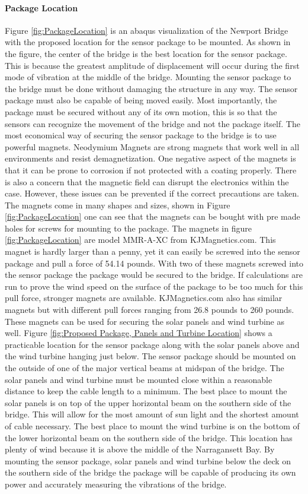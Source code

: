 \paragraph{Package Location}
\indent Figure \ref{fig:PackageLocation} is an abaqus visualization of the Newport Bridge with the proposed location for the sensor package to be mounted.
As shown in the figure, the center of the bridge is the best location for the sensor package. This is because the greatest amplitude of displacement will
occur during the first mode of vibration at the middle of the bridge. Mounting the sensor package to the bridge must be done without damaging the
structure in any way. The sensor package must also be capable of being moved easily. Most importantly, the package must be secured without any of its
own motion, this is so that the sensors can recognize the movement of the bridge and not the package itself. The most economical way of securing the
sensor package to the bridge is to use powerful magnets. Neodymium Magnets are strong magnets that work well in all environments and resist
demagnetization. One negative aspect of the magnets is that it can be prone to corrosion if not protected with a coating properly. There is also a
concern that the magnetic field can disrupt the electronics within the case. However, these issues can be prevented if the correct precautions are
taken. The magnets come in many shapes and sizes, shown in Figure \ref{fig:PackageLocation} one can see that the magnets can be bought with pre
made holes for screws for mounting to the package. The magnets in figure \ref{fig:PackageLocation} are model MMR-A-XC from KJMagnetics.com. This
magnet is hardly larger than a penny, yet it can easily be screwed into the sensor package and pull a force of 54.14 pounds. With two of these
magnets screwed into the sensor package the package would be secured to the bridge. If calculations are run to prove the wind speed on the
surface of the package to be too much for this pull force, stronger magnets are available. KJMagnetics.com also has similar magnets but with
different pull forces ranging from 26.8 pounds to 260 pounds. These magnets can be used for securing the solar panels and wind turbine as
well. Figure \ref{fig:Proposed Package, Panels and Turbine Location} shows a practicable location for the sensor package along with the solar
panels above and the wind turbine hanging just below. The sensor package should be mounted on the outside of one of the major vertical beams
at midspan of the bridge. The solar panels and wind turbine must be mounted close within a reasonable distance to keep the cable length to
a minimum. The best place to mount the solar panels is on top of the upper horizontal beam on the southern side of the bridge. This will
allow for the most amount of sun light and the shortest amount of cable necessary. The best place to mount the wind turbine is on the
bottom of the lower horizontal beam on the southern side of the bridge. This location has plenty of wind because it is above the middle
of the Narragansett Bay. By mounting the sensor package, solar panels and wind turbine below the deck on the southern side of the
bridge the package will be capable of producing its own power and accurately measuring the vibrations of the bridge.


